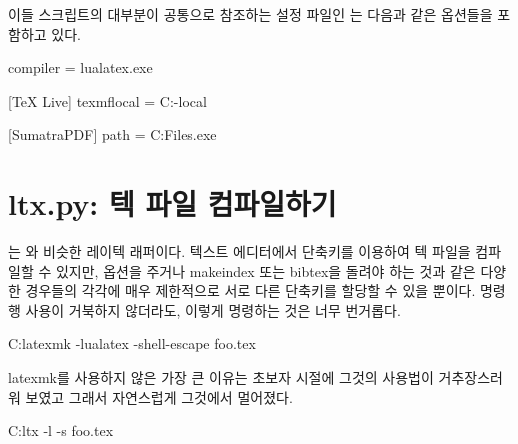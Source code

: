 이들 스크립트의 대부분이 공통으로 참조하는 설정 파일인 는 다음과 같은 옵션들을 포함하고 있다.

\begin{codewrite}
[LaTeX]
compiler = lualatex.exe

[TeX Live]
texmflocal = C:\texlive\texmf-local\tex\latex\local

[SumatraPDF]
path = C:\Program Files\SumatraPDF\SumatraPDF.exe
\end{codewrite}
\coderead[language=ini]

\section{ltx.py: 텍 파일 컴파일하기}

는 와 비슷한 레이텍 래퍼이다.
텍스트 에디터에서 단축키를 이용하여 텍 파일을 컴파일할 수 있지만,  옵션을 주거나 makeindex 또는 bibtex을 돌려야 하는 것과 같은 다양한 경우들의 각각에 매우 제한적으로 서로 다른 단축키를 할당할 수 있을 뿐이다.
명령행 사용이 거북하지 않더라도, 이렇게 명령하는 것은 너무 번거롭다.

\begin{code}
C:\>latexmk -lualatex -shell-escape foo.tex
\end{code}

latexmk를 사용하지 않은 가장 큰 이유는 초보자 시절에 그것의 사용법이 거추장스러워 보였고 그래서 자연스럽게 그것에서 멀어졌다.

\begin{code}
C:\>ltx -l -s foo.tex
\end{code}

